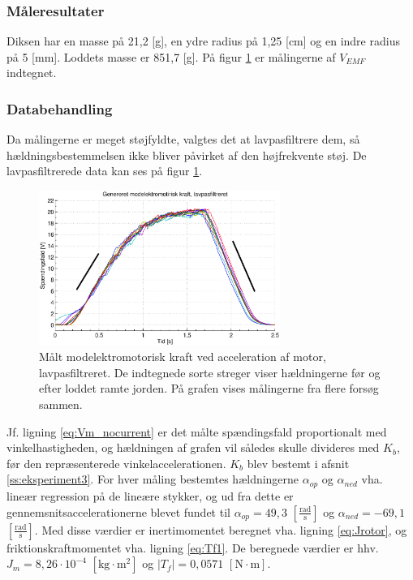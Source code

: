 \subsubsection{Måleresultater}
Diksen har en masse på 21,2 [g], en ydre radius på 1,25 [cm] og en indre radius på 5 [mm].
Loddets masse er 851,7 [g].
På figur \ref{fig:vemf1} er målingerne af \(V_{EMF}\) indtegnet.
% 
\subsubsection{Databehandling}
Da målingerne er meget støjfyldte, valgtes det at lavpasfiltrere dem, så hældningsbestemmelsen
ikke bliver påvirket af den højfrekvente støj.
De lavpasfiltrerede data kan ses på figur \ref{fig:vemf1}.
\begin{figure}[th!]
	\centering
	\includegraphics[width=0.7\textwidth]{./graphics/vemf1.eps}
	\captionsetup{width=0.7\textwidth}
	\caption[Målt modelektromotorisk kraft ved acceleration af motor, lavpasfiltreret]
		{Målt modelektromotorisk kraft ved acceleration af motor, lavpasfiltreret.
		De indtegnede sorte streger viser hældningerne før og efter loddet ramte jorden.
		På grafen vises målingerne fra flere forsøg sammen.}
	\label{fig:vemf1}
\end{figure}
Jf. ligning \ref{eq:Vm_nocurrent} er det målte spændingsfald proportionalt med
vinkelhastigheden, og hældningen af grafen vil således skulle divideres med \(K_b\),
før den repræsenterede vinkelaccelerationen. \(K_b\) blev bestemt i afsnit \ref{ss:eksperiment3}.
For hver måling bestemtes hældningerne \(\alpha_{op}\) og \(\alpha_{ned}\) vha. lineær regression på de lineære stykker,
og ud fra dette er gennemsnitsaccelerationerne blevet fundet til
\(\alpha_{op}=49,3\) \([\frac{\text{rad}}{\text{s}}]\) og \(\alpha_{ned}=-69,1\) \([\frac{\text{rad}}{\text{s}}]\).
Med disse værdier er inertimomentet beregnet vha. ligning \ref{eq:Jrotor}, og friktionskraftmomentet vha. ligning \ref{eq:Tf1}.
De beregnede værdier er hhv. \(J_m=8,26\cdot10^{-4}\) \([\text{kg}\cdot{\text{m}^2}]\) og \(\left| { T }_{ f } \right| =0,0571\) \( [\text{N} \cdot \text{m}]\).
